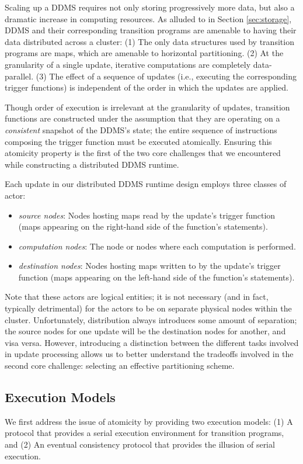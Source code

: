Scaling up a DDMS requires not only storing progressively more data, but also a
dramatic increase in computing resources.  As alluded to in Section
\ref{sec:storage}, DDMS and their corresponding transition programs are amenable
to having their data distributed across a cluster: (1) The only data structures
used by transition programs are maps, which are amenable to horizontal
partitioning.  (2) At the granularity of a single update, iterative computations
are completely data-parallel.  (3) The effect of a sequence of updates (i.e.,
executing the corresponding trigger functions) is independent of the order in
which the updates are applied.

Though order of execution is irrelevant at the granularity of updates,
transition functions are constructed under the assumption that they are
operating on a \textit{consistent} snapshot of the DDMS's state; the entire
sequence of instructions composing the trigger function must be executed
atomically.  Ensuring this atomicity property is the first of the two core
challenges that we encountered while constructing a distributed DDMS runtime.

Each update in our distributed DDMS runtime design employs three classes of actor:
\begin{itemize}
\item \textit{source nodes}: Nodes hosting maps read by the update's trigger
function (maps appearing on the right-hand side of the function's statements).
\item \textit{computation nodes}: The node or nodes where each computation is
performed.
\item \textit{destination nodes}: Nodes hosting maps written to by the update's
trigger function (maps appearing on the left-hand side of the function's
statements).
\end{itemize}
Note that these actors are logical entities; it is not necessary (and in fact,
typically detrimental) for the actors to be on separate physical nodes within
the cluster.  Unfortunately, distribution always introduces some amount of
separation; the source nodes for one update will be the destination nodes for
another, and visa versa.  However, introducing a distinction between the
different tasks involved in update processing allows us to better understand the
tradeoffs involved in the second core challenge: selecting an effective
partitioning scheme.

\subsection{Execution Models}
We first address the issue of atomicity by providing two execution models: (1) A
protocol that provides a serial execution environment for transition programs,
and (2) An eventual consistency protocol that provides the illusion of serial
execution.

